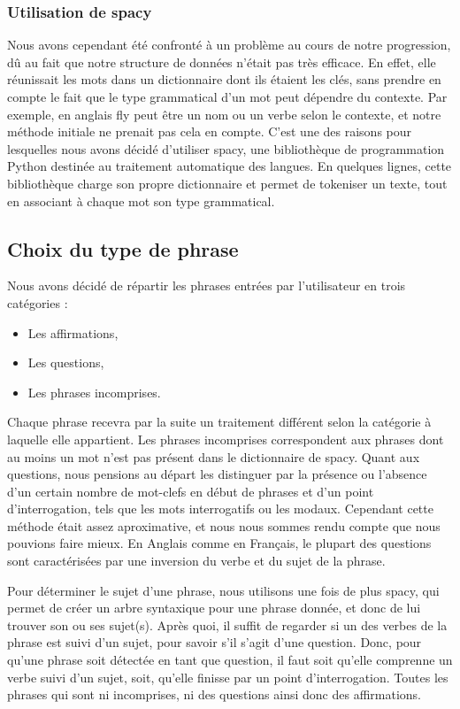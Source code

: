 \documentclass[paper=a4, fontsize=12pt]{article}
\begin{document}
\subsubsection{Utilisation de spacy}
Nous avons cependant été confronté à un problème au cours de notre progression, dû au fait que notre structure de données n'était pas très efficace. En effet, elle réunissait les mots dans un dictionnaire dont ils étaient les clés, sans prendre en compte le fait que le type grammatical d'un mot peut dépendre du contexte. Par exemple, en anglais \og fly \fg{} peut être un nom ou un verbe selon le contexte, et notre méthode initiale ne prenait pas cela en compte. C'est une des raisons pour lesquelles nous avons décidé d'utiliser spacy, une bibliothèque de programmation Python destinée au traitement automatique des langues. En quelques lignes, cette bibliothèque charge son propre dictionnaire et permet de tokeniser un texte, tout en associant à chaque mot son type grammatical.


\subsection{Choix du type de phrase}
Nous avons décidé de répartir les phrases entrées par l'utilisateur en trois catégories :
\begin{itemize}
\item Les affirmations,
\item Les questions,
\item Les phrases incomprises.
\end{itemize}


Chaque phrase recevra par la suite un traitement différent selon la catégorie à laquelle elle appartient. Les phrases incomprises correspondent aux phrases dont au moins un mot n'est pas présent dans le dictionnaire de spacy. Quant aux questions, nous pensions au départ les distinguer par la présence ou l'absence d'un certain nombre de mot-clefs en début de phrases et d'un point d'interrogation, tels que les mots interrogatifs ou les modaux. Cependant cette méthode était assez aproximative, et nous nous sommes rendu compte que nous pouvions faire mieux. En Anglais comme en Français, le plupart des questions sont caractérisées par une inversion du verbe et du sujet de la phrase.

Pour déterminer le sujet d'une phrase, nous utilisons une fois de plus spacy, qui permet de créer un arbre syntaxique pour une phrase donnée, et donc de lui trouver son ou ses sujet(s). Après quoi, il suffit de regarder si un des verbes de la phrase est suivi d'un sujet, pour savoir s'il s'agit d'une question. Donc, pour qu'une phrase soit détectée en tant que question, il faut soit qu'elle comprenne un verbe suivi d'un sujet, soit, qu'elle finisse par un point d'interrogation. Toutes les phrases qui sont ni incomprises, ni des questions ainsi donc des affirmations.
\end{document}
